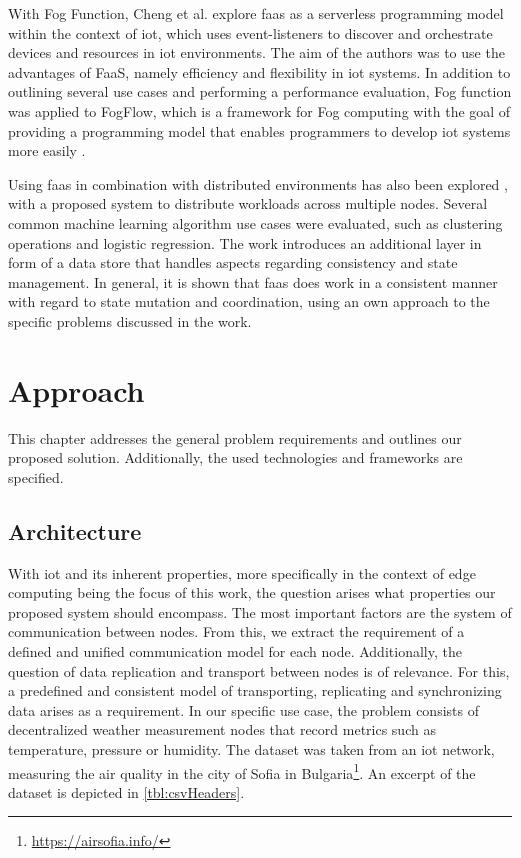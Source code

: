 \documentclass[conference]{IEEEtran}
\begin{document}
With Fog Function, Cheng et al. \cite{fogfunction} explore \ac{faas} as a serverless programming model within the context of \ac{iot}, which uses event-listeners to discover and orchestrate devices and resources in \ac{iot} environments. The aim of the authors was to use the advantages of FaaS, namely efficiency and flexibility in \ac{iot} systems.
In addition to outlining several use cases and performing a performance evaluation, Fog function was applied to FogFlow, which is a framework for Fog computing with the goal of providing a programming model that enables programmers to develop \ac{iot} systems more easily \cite{Cheng2018FogFlow:Cities}.

Using \ac{faas} in combination with distributed environments has also been explored \cite{Barcelona-Pons2019OnArchitectures}, with a proposed system to distribute workloads across multiple nodes. Several common machine learning algorithm use cases were evaluated, such as clustering operations and logistic regression. The work introduces an additional layer in form of a data store that handles aspects regarding consistency and state management. In general, it is shown that \ac{faas} does work in a consistent manner with regard to state mutation and coordination, using an own approach to the specific problems discussed in the work.

\section{Approach}\label{Chap:Approach}
This chapter addresses the general problem requirements and outlines our proposed solution. Additionally, the used technologies and frameworks are specified.

\subsection{Architecture}\label{Sec:Architecture}
With \ac{iot} and its inherent properties, more specifically in the context of edge computing being the focus of this work, the question arises what properties our proposed system should encompass. The most important factors are the system of communication between nodes. From this, we extract the requirement of a defined and unified communication model for each node. Additionally, the question of data replication and transport between nodes is of relevance. For this, a predefined and consistent model of transporting, replicating and synchronizing data arises as a requirement.
In our specific use case, the problem consists of decentralized weather measurement nodes that record metrics such as temperature, pressure or humidity. The dataset was taken from an \ac{iot} network, measuring the air quality in the city of Sofia in Bulgaria\footnote{\url{https://airsofia.info/}}. An excerpt of the dataset is depicted in \autoref{tbl:csvHeaders}.
\end{document}

